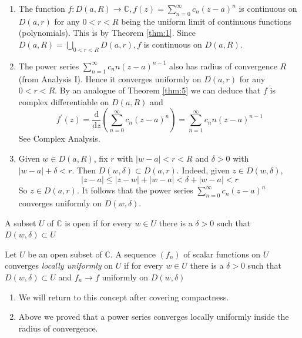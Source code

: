 \documentclass[a4paper]{article}
\begin{document}
\begin{remark}
    \begin{enumerate}
        \item The function $f: D(a, R) \rightarrow \mathbb{C}, f(z)=\sum_{n=0}^{\infty} c_{n}(z-a)^{n}$ is continuous on $D(a, r)$ for any $0<r<R$ being the uniform limit of continuous functions (polynomials). This is by Theorem \ref{thm:1}. Since $D(a, R)=\bigcup_{0<r<R} D(a, r), f$ is continuous on $D(a, R)$.
        
        \item  The power series $\sum_{n=1}^{\infty} c_{n} n(z-a)^{n-1}$ also has radius of convergence $R$ (from Analysis I). Hence it converges uniformly on $D(a, r)$ for any $0<r<R$. By an analogue of Theorem \ref{thm:5} we can deduce that $f$ is complex differentiable on $D(a, R)$ and
        \[
        f^{\prime}(z)=\frac{\mathrm{d}}{\mathrm{d} z}\left(\sum_{n=0}^{\infty} c_{n}(z-a)^{n}\right)=\sum_{n=1}^{\infty} c_{n} n(z-a)^{n-1}
        \]
        See Complex Analysis.
    
        \item Given $w \in D(a, R)$, fix $r$ with $|w-a|<r<R$ and $\delta>0$ with $|w-a|+\delta<r$. Then $D(w, \delta) \subset D(a, r) .$ Indeed, given $z \in D(w, \delta)$,
        \[
        |z-a| \leqslant|z-w|+|w-a|<\delta+|w-a|<r
        \]
        So $z \in D(a, r)$. It follows that the power series $\sum_{n=0}^{\infty} c_{n}(z-a)^{n}$ converges uniformly on $D(w, \delta)$.
    \end{enumerate}
\end{remark}
\begin{definition}
    A subset $U$ of $\mathbb{C}$ is open if for every $w \in U$ there is a $\delta>0$ such that $D(w, \delta) \subset U$
\end{definition}

\begin{definition}
    Let $U$ be an open subset of $\mathbb{C}$. A sequence $\left(f_{n}\right)$ of scalar functions on $U$ converges \textit{locally uniformly} on $U$ if for every $w \in U$ there is a $\delta>0$ such that $D(w, \delta) \subset U$ and $f_{n} \rightarrow f$ uniformly on $D(w, \delta)$
\end{definition}

\begin{remark}
    \begin{enumerate}
        \item We will return to this concept after covering compactness.
        \item Above we proved that a power series converges locally uniformly inside the radius of convergence.
    \end{enumerate}
\end{remark}
\end{document}

